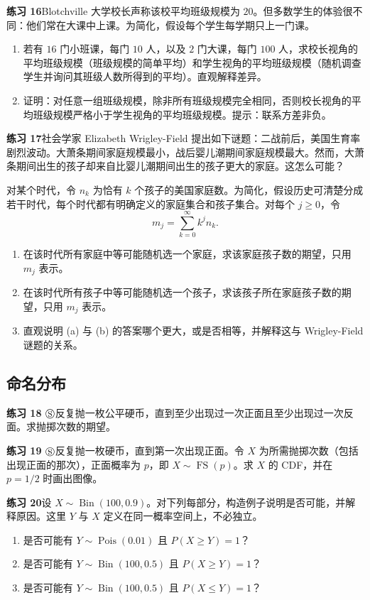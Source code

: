\documentclass[UTF8, 12pt, fontset=fandol, oneside]{ctexart}
\begin{document}
\noindent\textbf{练习 16}\quad Blotchville 大学校长声称该校平均班级规模为 $20$。但多数学生的体验很不同：他们常在大课中上课。为简化，假设每个学生每学期只上一门课。
\begin{enumerate}
  \item[(a)] 若有 $16$ 门小班课，每门 $10$ 人，以及 $2$ 门大课，每门 $100$ 人，求校长视角的平均班级规模（班级规模的简单平均）和学生视角的平均班级规模（随机调查学生并询问其班级人数所得到的平均）。直观解释差异。
  \item[(b)] 证明：对任意一组班级规模，除非所有班级规模完全相同，否则校长视角的平均班级规模严格小于学生视角的平均班级规模。提示：联系方差非负。
\end{enumerate}

\noindent\textbf{练习 17}\quad 社会学家 Elizabeth Wrigley-Field 提出如下谜题：二战前后，美国生育率剧烈波动。大萧条期间家庭规模最小，战后婴儿潮期间家庭规模最大。然而，大萧条期间出生的孩子却来自比婴儿潮期间出生的孩子更大的家庭。这怎么可能？

对某个时代，令 $n_k$ 为恰有 $k$ 个孩子的美国家庭数。为简化，假设历史可清楚分成若干时代，每个时代都有明确定义的家庭集合和孩子集合。对每个 $j\ge 0$，令
\[
  m_j=\sum_{k=0}^{\infty} k^j n_k.
\]
\begin{enumerate}
  \item[(a)] 在该时代所有家庭中等可能随机选一个家庭，求该家庭孩子数的期望，只用 $m_j$ 表示。
  \item[(b)] 在该时代所有孩子中等可能随机选一个孩子，求该孩子所在家庭孩子数的期望，只用 $m_j$ 表示。
  \item[(c)] 直观说明 (a) 与 (b) 的答案哪个更大，或是否相等，并解释这与 Wrigley-Field 谜题的关系。
\end{enumerate}

\subsection*{命名分布}

\noindent\textbf{练习 18 $\circledS$}\quad 反复抛一枚公平硬币，直到至少出现过一次正面且至少出现过一次反面。求抛掷次数的期望。

\noindent\textbf{练习 19 $\circledS$}\quad 反复抛一枚硬币，直到第一次出现正面。令 $X$ 为所需抛掷次数（包括出现正面的那次），正面概率为 $p$，即 $X\sim\operatorname{FS}(p)$。求 $X$ 的 CDF，并在 $p=1/2$ 时画出图像。

\noindent\textbf{练习 20}\quad 设 $X\sim\operatorname{Bin}(100,0.9)$。对下列每部分，构造例子说明是否可能，并解释原因。这里 $Y$ 与 $X$ 定义在同一概率空间上，不必独立。
\begin{enumerate}
  \item[(a)] 是否可能有 $Y\sim\operatorname{Pois}(0.01)$ 且 $P(X\ge Y)=1$？
  \item[(b)] 是否可能有 $Y\sim\operatorname{Bin}(100,0.5)$ 且 $P(X\ge Y)=1$？
  \item[(c)] 是否可能有 $Y\sim\operatorname{Bin}(100,0.5)$ 且 $P(X\le Y)=1$？
\end{enumerate}
\end{document}
